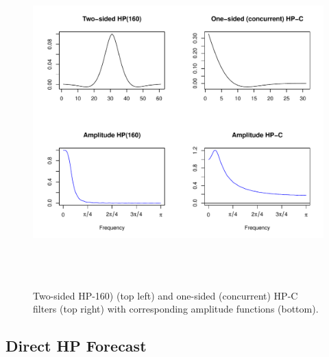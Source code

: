 \documentclass[a4paper]{article}
\begin{document}
\begin{figure}[H]\begin{center}\includegraphics[height=5in, width=6in]{./Figures/hp_160.pdf}\caption{Two-sided HP-160) (top left) and one-sided (concurrent) HP-C filters (top right) with corresponding amplitude functions (bottom).\label{hp_160}}\end{center}\end{figure}
\subsection{Direct HP Forecast}\label{hpdf}
\end{document}
